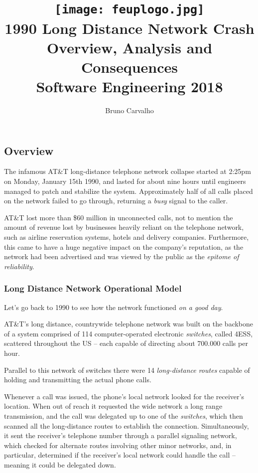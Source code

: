 \documentclass[12pt,a4paper,notitlepage]{article}
\title{
	\vspace{-2\baselineskip}
	\texttt{[image: feuplogo.jpg]}\\
	{\Huge \att{} 1990 Long Distance Network Crash}\\
	{\Large Overview, Analysis and Consequences}\\
	{\normalsize Software Engineering 2018}
}
\author{
	Bruno Carvalho \hspace*{1em} \text{up201606517}
}
\newcommand*{\att}{AT\&T}
\begin{document}
\maketitle
\thispagestyle{empty}

\subsection{Overview}

The infamous \att{} long-distance telephone network collapse started at 2:25pm on Monday, January 15th 1990, and lasted for about nine hours until engineers managed to patch and stabilize the system.\supercite{dennisburke1995}
Approximately half of all calls placed on the network failed to go through, returning a \emph{busy} signal to the caller.

\att{} lost more than \$60 million in unconnected calls, not to mention the amount of revenue lost by businesses heavily reliant on the telephone network, such as airline reservation systems, hotels and delivery companies. Furthermore, this came to have a huge negative impact on the company's reputation, as the network had been advertised and was viewed by the public as the \textsl{epitome of reliability}.\supercite{popularscience1990}

\subsubsection{Long Distance Network Operational Model}

Let's go back to 1990 to see how the network functioned \textsl{on a good day}.

\att{}'s long distance, countrywide telephone network was built on the backbone of a system comprised of 114 computer-operated electronic \emph{switches}, called 4ESS, scattered throughout the US -- each capable of directing about 700.000 calls per hour.

Parallel to this network of switches there were 14 \emph{long-distance routes} capable of holding and transmitting the actual phone calls.\supercite{dennisburke1995}

Whenever a call was issued, the phone's local network looked for the receiver's location.
When out of reach it requested the wide network a long range transmission, and the call was delegated up to one of the \emph{switches}, which then scanned all the long-distance routes to establish the connection.
Simultaneously, it sent the receiver's telephone number through a parallel signaling network, which checked for alternate routes involving other minor networks, and, in particular, determined if the receiver's local network could handle the call -- meaning it could be delegated down.
\end{document}
